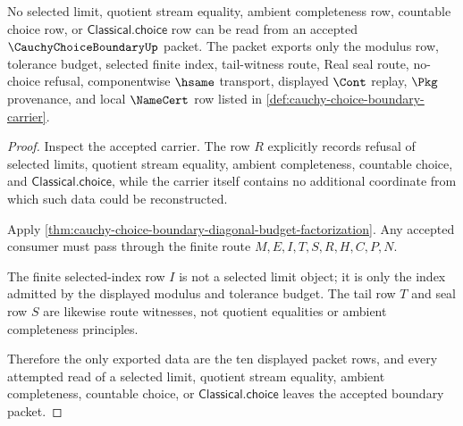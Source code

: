 \begin{theorem}
\label{thm:cauchy-choice-boundary-no-choice-nonescape}
No selected limit, quotient stream equality, ambient completeness row, countable choice row, or $\mathsf{Classical.choice}$ row can be read from an accepted $\CauchyChoiceBoundaryUp$ packet. The packet exports only the modulus row, tolerance budget, selected finite index, tail-witness route, Real seal route, no-choice refusal, componentwise $\hsame$ transport, displayed $\Cont$ replay, $\Pkg$ provenance, and local $\NameCert$ row listed in \autoref{def:cauchy-choice-boundary-carrier}.
\end{theorem}
\begin{proof}
Inspect the accepted carrier. The row $R$ explicitly records refusal of selected limits, quotient stream equality, ambient completeness, countable choice, and $\mathsf{Classical.choice}$, while the carrier itself contains no additional coordinate from which such data could be reconstructed.

Apply \autoref{thm:cauchy-choice-boundary-diagonal-budget-factorization}. Any accepted consumer must pass through the finite route $M,E,I,T,S,R,H,C,P,N$.

The finite selected-index row $I$ is not a selected limit object; it is only the index admitted by the displayed modulus and tolerance budget. The tail row $T$ and seal row $S$ are likewise route witnesses, not quotient equalities or ambient completeness principles.

Therefore the only exported data are the ten displayed packet rows, and every attempted read of a selected limit, quotient stream equality, ambient completeness, countable choice, or $\mathsf{Classical.choice}$ leaves the accepted boundary packet.
\end{proof}

